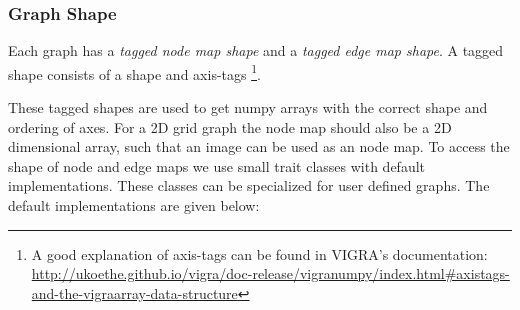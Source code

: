 \subsubsection{Graph Shape}


Each graph has a \emph{tagged node map shape} 
and a \emph{tagged edge map shape}. 
A tagged shape consists of a shape and axis-tags
\footnote{
    A good explanation of axis-tags can be found in VIGRA's documentation:
    \url{http://ukoethe.github.io/vigra/doc-release/vigranumpy/index.html\#axistags-and-the-vigraarray-data-structure}
}.


These tagged shapes are used to get numpy arrays with 
the correct shape and ordering of axes.
For a 2D grid graph the node map should also be a 2D dimensional array,
such that an image can be used as an node map.
To access the shape of node and edge maps 
we use small trait classes with  default implementations.
These classes can be specialized for user defined graphs.
The default implementations are given below:


